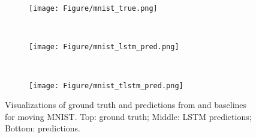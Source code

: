 \begin{figure}[htbp]
\begin{center}
        \begin{subfigure}[b]{\textwidth}
            \texttt{[image: Figure/mnist\_true.png]}
            \label{app:fig:lorenz_80}
            \label{app:fig:f1}
        \end{subfigure}\\
                \begin{subfigure}[b]{\textwidth}
            \texttt{[image: Figure/mnist\_lstm\_pred.png]}
            \label{app:fig:lorenz_80}
            \label{app:fig:f1}
        \end{subfigure}\\
                \begin{subfigure}[b]{\textwidth}
            \texttt{[image: Figure/mnist\_tlstm\_pred.png]}
            \label{app:fig:lorenz_80}
            \label{app:fig:f1}
        \end{subfigure}
         \caption{Visualizations of  ground truth and predictions from \tlstm{} and baselines for moving MNIST. Top: ground truth; Middle: LSTM predictions; Bottom: \tlstm{} predictions.}
    \label{app:fig:genz}
     \vskip -0.2in
    \end{center}
\end{figure}



